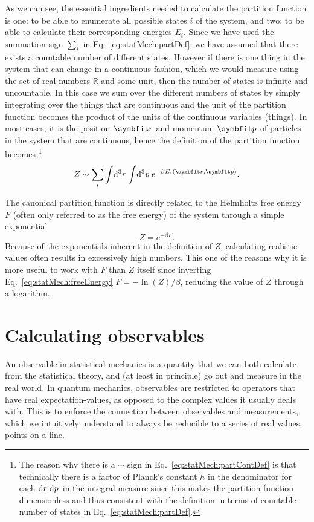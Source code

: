 As we can see, the essential ingredients needed to calculate the partition function is one: to be able to
enumerate all possible states $i$ of the system, and two: to be able to calculate their corresponding energies $E_i$.
Since we have used the summation sign $\sum_i$ in Eq.~\eqref{eq:statMech:partDef}, we have 
assumed that there exists a countable number of different states. However if there is one thing in the
system that can change in a continuous fashion, which we would measure using the set of real numbers
$\mathbb{R}$ and some unit, then the number of states is infinite and uncountable. In this case we sum over the
different numbers of states by simply integrating over the things that are continuous and the unit
of the partition function becomes the product of the units of the continuous variables (things).
In most cases, it is the position $\v{r}$ and momentum $\v{p}$ of particles in the system that are continuous, hence
the definition of the partition function becomes%
\footnote{The reason why there is a $\sim$ sign in Eq.~\eqref{eq:statMech:partContDef} is that technically there is a factor
of Planck's constant $h$ in the denominator for each $\mathop{\textrm{d}\kern0emr\kern0.1em}\mathop{\textrm{d}\kern0emp\kern0.1em}$ in the integral measure since this makes the partition function
dimensionless and thus consistent with the definition in terms of countable number of states in Eq.~\eqref{eq:statMech:partDef}.}
\begin{equation}
    Z \sim \sum_i\sint\d{^3r}\sint\d{^3p} e^{-\beta E_i(\v{r},\v{p})}.
    \label{eq:statMech:partContDef}
\end{equation}

The canonical partition function is directly related to the Helmholtz free energy $F$ (often only referred to
as the free energy) of the system through a simple exponential
\begin{equation}
    \label{eq:statMech:freeEnergy}
    Z = e^{-\beta F}.
\end{equation}
Because of the exponentials inherent in the definition of $Z$, calculating realistic values often results
in excessively high numbers. This one of the reasons why it is more useful to work with $F$ than $Z$ itself
since inverting Eq.~\eqref{eq:statMech:freeEnergy} $F = -\ln(Z)/\beta$, reducing the value of $Z$ through
a logarithm.

\section{Calculating observables}

An observable in statistical mechanics is a quantity that we can both calculate from the statistical theory,
and (at least in principle) go out and measure in the real world. In quantum mechanics, observables
are restricted to operators that have real expectation-values, as opposed to the complex values it usually
deals with. This is to enforce the connection between observables and measurements, which we intuitively understand
to always be reducible to a series of real values, \ie points on a line.

